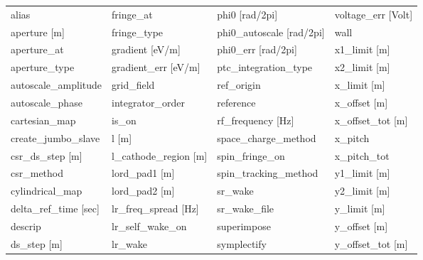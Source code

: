 \begin{tabular}{llll} \toprule
alias                            & fringe_at                        & phi0 [rad/2pi]                   & voltage_err [Volt]               \\
aperture [m]                     & fringe_type                      & phi0_autoscale [rad/2pi]         & wall                             \\
aperture_at                      & gradient [eV/m]                  & phi0_err [rad/2pi]               & x1_limit [m]                     \\
aperture_type                    & gradient_err [eV/m]              & ptc_integration_type             & x2_limit [m]                     \\
autoscale_amplitude              & grid_field                       & ref_origin                       & x_limit [m]                      \\
autoscale_phase                  & integrator_order                 & reference                        & x_offset [m]                     \\
cartesian_map                    & is_on                            & rf_frequency [Hz]                & x_offset_tot [m]                 \\
create_jumbo_slave               & l [m]                            & space_charge_method              & x_pitch                          \\
csr_ds_step [m]                  & l_cathode_region [m]             & spin_fringe_on                   & x_pitch_tot                      \\
csr_method                       & lord_pad1 [m]                    & spin_tracking_method             & y1_limit [m]                     \\
cylindrical_map                  & lord_pad2 [m]                    & sr_wake                          & y2_limit [m]                     \\
delta_ref_time [sec]             & lr_freq_spread [Hz]              & sr_wake_file                     & y_limit [m]                      \\
descrip                          & lr_self_wake_on                  & superimpose                      & y_offset [m]                     \\
ds_step [m]                      & lr_wake                          & symplectify                      & y_offset_tot [m]                 \\

\end{tabular}
